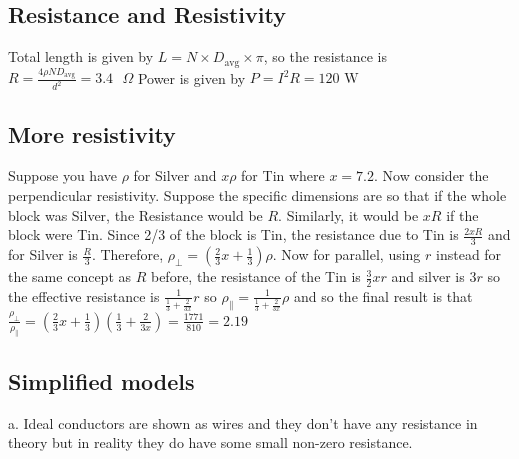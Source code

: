 \documentclass{article}
\begin{document}
\subsection{Resistance and Resistivity}
Total length is given by $L=N \times D_{\text{avg}} \times \pi$, so the resistance is $R=\frac{4\rho N D_{\text{avg}}}{ d^2}=3.4 \text{ }\Omega$
\newline
Power is given by $P=I^2 R = 120 \text{ W}$
\subsection{More resistivity}
Suppose you have $\rho$ for Silver and $x \rho$ for Tin where $x=7.2$. Now consider the perpendicular resistivity. Suppose the specific dimensions are so that if the whole block was Silver, the Resistance would be $R$. Similarly, it would be $xR$ if the block were Tin. Since 2/3 of the block is Tin, the resistance due to Tin is $\frac{2xR}{3}$ and for Silver is $\frac{R}{3}$. Therefore, $\rho_{\perp}=\left(\frac{2}{3}x + \frac{1}{3}\right)\rho$. Now for parallel, using $r$ instead for the same concept as $R$ before, the resistance of the Tin is $\frac{3}{2} xr$ and silver is $3r$ so the effective resistance is $\frac{1}{\frac{1}{3}+\frac{2}{3x}}r$ so $\rho_\parallel = \frac{1}{\frac{1}{3}+\frac{2}{3x}} \rho$ and so the final result is that $\frac{\rho_\perp}{\rho_\parallel}=(\frac{2}{3}x + \frac{1}{3})(\frac{1}{3}+\frac{2}{3x})=\frac{1771}{810}=2.19$
\subsection{Simplified models}
a. Ideal conductors are shown as wires and they don't have any resistance in theory but in reality they do have some small non-zero resistance.
\end{document}
